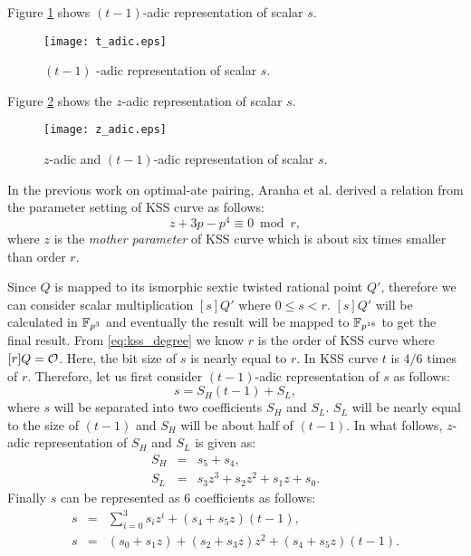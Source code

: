Figure \ref{fig:t_adic} shows $(t-1)$-adic representation of scalar $s$. 
\begin{figure}[!ht]
\centering
\texttt{[image: t\_adic.eps]}
\caption{$(t-1)$ -adic representation of scalar $s$.}
\label{fig:t_adic}
\end{figure}

Figure \ref{fig:z_adicl} shows the  $z$-adic representation of scalar $s$. 
\begin{figure}[!ht]
\centering
\texttt{[image: z\_adic.eps]}
\caption{$z$-adic and $(t-1)$-adic representation of scalar $s$.}
\label{fig:z_adicl}
\end{figure}
In the previous work on optimal-ate pairing, Aranha et al. \cite{PAIRING:AFKMR12} derived a relation from the parameter setting of KSS curve as follows:
\begin{equation}\label{eq:aranha_relation}
z+3p-p^4 \equiv 0 \bmod {r},
\end{equation}
where $z$ is the \textit{mother parameter} of KSS curve which is about six times smaller than order $r$. 

Since $Q$ is mapped to its ismorphic sextic twisted rational point $Q'$, therefore we can consider scalar multiplication $[s]Q'$ where $0 \leq s < r$. $[s]Q'$ will be calculated in $\mathbb{F}_{p^3}$ and eventually the result will be mapped to $\mathbb{F}_{p^{18}}$ to get the final result. From \eqref{eq:kss_degree} we know $r$ is the order of KSS curve  where $[r]Q=\cal O$. Here, the bit size of $s$ is nearly equal to $r$. In KSS curve $t$ is  $4/6$ times of  $r$. Therefore, let us first consider $(t-1)$-adic representation of $s$ as follows:
\begin{equation}\label{eq:t-1_adic}
s =  S_H(t-1)+S_L,
\end{equation}
where $s$ will be separated into two coefficients $S_H$ and $S_L$. $S_L$ will be nearly equal to the size of $(t-1)$ and $S_H$ will be about half of $(t-1)$. 
In what follows, $z$-adic representation of $S_H$ and $S_L$ is given as:
\begin{eqnarray}\label{eq:scalar_mul_Q}
S_H & =  & s_5+ s_4,\nonumber \\
S_L & = & s_3 z^3+s_2 z^2+s_1 z+s_0.\nonumber 
\end{eqnarray}
Finally $s$ can be represented as 6 coefficients as follows:
\begin{eqnarray}\label{eq:sclar_final_rep}
s & =  & \sum_{i=0}^{3} s_iz^i + (s_4+s_5z)(t-1),\nonumber \\
s & = & (s_0+s_1z) + (s_2 +s_3z)z^2 +(s_4+s_5z)(t-1).
\end{eqnarray}

